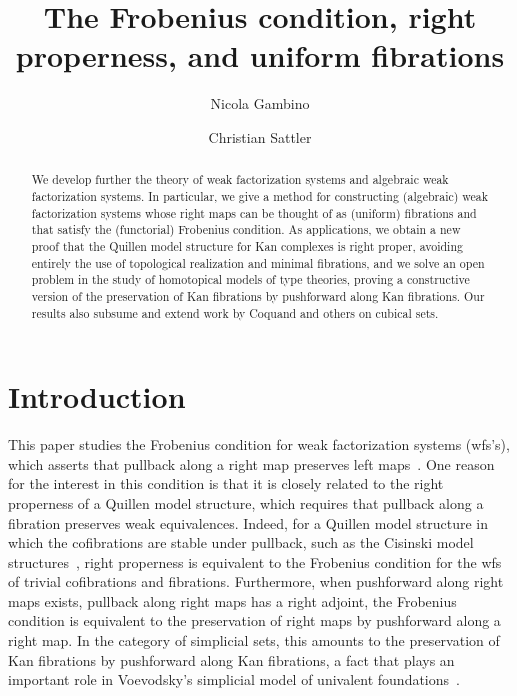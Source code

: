 \documentclass[reqno,10pt,a4paper,oneside,draft]{amsart}
\title{The Frobenius condition, right properness, \linebreak and uniform fibrations}
\begin{document}
\begin{abstract}
We develop further the theory of weak factorization systems and algebraic weak factorization systems.
In particular, we give a method for constructing (algebraic) weak factorization systems whose right maps can be thought of as (uniform) fibrations and that satisfy the (functorial) Frobenius condition.
As applications, we obtain a new proof that the Quillen model structure for Kan complexes is right proper, avoiding entirely the use of topological realization and minimal fibrations, and we solve an open problem in the study of homotopical models of type theories, proving a constructive version of the preservation of Kan fibrations by pushforward along Kan fibrations.
Our results also subsume and extend work by Coquand and others on cubical sets.
\end{abstract}

\author{Nicola Gambino}
\address{School of Mathematics, University of Leeds, Leeds LS2 9JT, UK}

\author{Christian Sattler}
\address{School of Mathematics, University of Leeds, Leeds LS2 9JT, UK}


\maketitle

\section*{Introduction}

This paper studies the Frobenius condition for weak factorization systems (wfs's), which asserts that pullback along a right map preserves left maps~\cite{garner:topological-simplicial,gambino-garner:idtypewfs}.
One reason for the interest in this condition is that it is closely related to the right properness of a Quillen model structure, which requires that pullback along a fibration preserves weak equivalences.
Indeed, for a Quillen model structure in which the cofibrations are stable under pullback, such as the Cisinski model structures~\cite{cisinski-asterisque}, right properness is equivalent to the Frobenius condition for the wfs of trivial cofibrations and fibrations.
Furthermore, when pushforward along right maps exists, \ie pullback along right maps has a right adjoint, the Frobenius condition is equivalent to the preservation of right maps by pushforward along a right map.
In the category of simplicial sets, this amounts to the preservation of Kan fibrations by pushforward along Kan fibrations, a fact that plays an important role in Voevodsky's simplicial model of univalent foundations~\cite{voevodsky-simplicial-model}.
\end{document}
